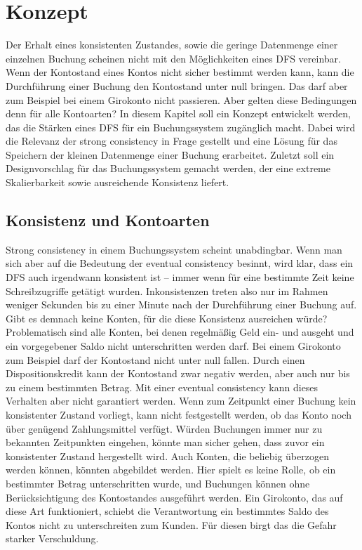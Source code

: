 \documentclass[12pt,oneside,a4paper,parskip]{scrbook}
\begin{document}
\cleardoublepage
\chapter{Konzept}
\label{concept}
Der Erhalt eines konsistenten Zustandes, sowie die geringe Datenmenge einer einzelnen Buchung scheinen nicht mit den Möglichkeiten eines DFS vereinbar. Wenn der Kontostand eines Kontos nicht sicher bestimmt werden kann, kann die Durchführung einer Buchung den Kontostand unter null bringen. Das darf aber zum Beispiel bei einem Girokonto nicht passieren. Aber gelten diese Bedingungen denn für alle Kontoarten? In diesem Kapitel soll ein Konzept entwickelt werden, das die Stärken eines DFS für ein Buchungssystem zugänglich macht. Dabei wird die Relevanz der strong consistency in Frage gestellt und eine Lösung für das Speichern der kleinen Datenmenge einer Buchung erarbeitet. Zuletzt soll ein Designvorschlag für das Buchungssystem gemacht werden, der eine extreme Skalierbarkeit sowie ausreichende Konsistenz liefert.

\section{Konsistenz und Kontoarten}
\label{konsistenzKonten}
Strong consistency in einem Buchungssystem scheint unabdingbar. Wenn man sich aber auf die Bedeutung der eventual consistency besinnt, wird klar, dass ein DFS auch irgendwann konsistent ist – immer wenn für eine bestimmte Zeit keine Schreibzugriffe getätigt wurden. 
Inkonsistenzen treten also nur im Rahmen weniger Sekunden bis zu einer Minute nach der Durchführung einer Buchung auf. Gibt es demnach keine Konten, für die diese Konsistenz ausreichen würde? Problematisch sind alle Konten, bei denen regelmäßig Geld ein- und ausgeht und ein vorgegebener Saldo nicht unterschritten werden darf. Bei einem Girokonto zum Beispiel darf der Kontostand nicht unter null fallen. Durch einen Dispositionskredit kann der Kontostand zwar negativ werden, aber auch nur bis zu einem bestimmten Betrag. Mit einer eventual consistency kann dieses Verhalten aber nicht garantiert werden. Wenn zum Zeitpunkt einer Buchung kein konsistenter Zustand vorliegt, kann nicht festgestellt werden, ob das Konto noch über genügend Zahlungsmittel verfügt. Würden Buchungen immer nur zu bekannten Zeitpunkten eingehen, könnte man sicher gehen, dass zuvor ein konsistenter Zustand hergestellt wird. Auch Konten, die beliebig überzogen werden können, könnten abgebildet werden. Hier spielt es keine Rolle, ob ein bestimmter Betrag unterschritten wurde, und Buchungen können ohne Berücksichtigung des Kontostandes ausgeführt werden. Ein Girokonto, das auf diese Art funktioniert, schiebt die Verantwortung ein bestimmtes Saldo des Kontos nicht zu unterschreiten zum Kunden. Für diesen birgt das die Gefahr starker Verschuldung.
\end{document}
